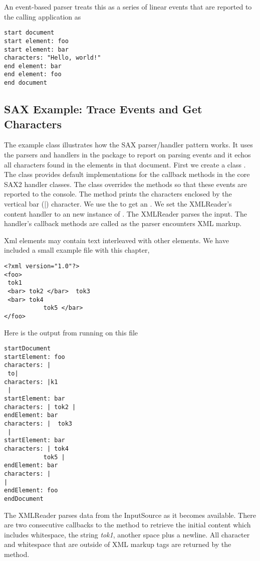 An event-based parser treats this as a series of linear events
that are reported to the calling application as
\begin{verbatim}
start document
start element: foo
start element: bar
characters: "Hello, world!"
end element: bar
end element: foo
end document
\end{verbatim}

\subsection{SAX Example: Trace Events and Get Characters}

The example class  illustrates 
how the SAX parser/handler pattern works.
It uses the parsers and handlers in the
 package to report on parsing events and it
echos all characters found in the elements in that document.
%
% 
First we create a class .
%
%
The class  provides default implementations
for the callback methods in the core SAX2 handler classes.
The  class overrides the methods 
so that these events are reported to the console.
The  method prints the characters enclosed by
the vertical bar (|) character.
%
%
We use the  to get an .
We set the XMLReader's content handler to an new instance
of .
The XMLReader parses the input.
The handler's callback methods are called as the parser encounters
XML markup.

Xml elements may contain text interleaved with other elements.
We have included a small example file with this chapter,
%
\begin{verbatim}
<?xml version="1.0"?>
<foo> 
 tok1 
 <bar> tok2 </bar>  tok3 
 <bar> tok4 
           tok5 </bar>
</foo>
\end{verbatim} 
Here is the output from running  on this file
\begin{verbatim} 
startDocument
startElement: foo
characters: | 
 to|
characters: |k1 
 |
startElement: bar
characters: | tok2 |
endElement: bar
characters: |  tok3 
 |
startElement: bar
characters: | tok4 
           tok5 |
endElement: bar
characters: |
|
endElement: foo
endDocument
\end{verbatim}
The XMLReader parses data from the InputSource as it becomes available.
There are two consecutive callbacks to the  method to
retrieve the initial content which includes whitespace, the string \emph{tok1},
another space plus a newline.
All character and whitespace that are outside of XML markup tags are returned
by the  method.







